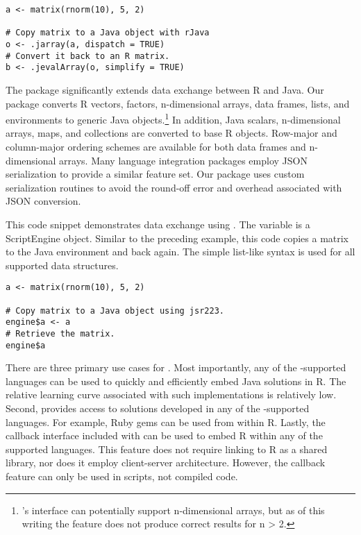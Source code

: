 \begin{verbatim}
a <- matrix(rnorm(10), 5, 2)

# Copy matrix to a Java object with rJava
o <- .jarray(a, dispatch = TRUE)
# Convert it back to an R matrix.
b <- .jevalArray(o, simplify = TRUE)
\end{verbatim}

The  package significantly extends data exchange between R and Java. Our package converts R vectors, factors, n-dimensional arrays, data frames, lists, and environments to generic Java objects.\footnote{'s interface can potentially support n-dimensional arrays, but as of this writing the feature does not produce correct results for n > 2.} In addition, Java scalars, n-dimensional arrays, maps, and collections are converted to base R objects. Row-major and column-major ordering schemes are available for both data frames and n-dimensional arrays. Many language integration packages employ JSON serialization to provide a similar feature set. Our package uses custom serialization routines to avoid the round-off error and overhead associated with JSON conversion.

This code snippet demonstrates data exchange using . The  variable is a  ScriptEngine object. Similar to the preceding  example, this code copies a matrix to the Java environment and back again. The simple list-like syntax is used for all supported data structures.

\begin{verbatim}
a <- matrix(rnorm(10), 5, 2)

# Copy matrix to a Java object using jsr223.
engine$a <- a
# Retrieve the matrix.
engine$a
\end{verbatim}

There are three primary use cases for . Most importantly, any of the -supported languages can be used to quickly and efficiently embed Java solutions in R. The relative learning curve associated with such implementations is relatively low. Second,  provides access to solutions developed in any of the -supported languages. For example, Ruby gems can be used from within R. Lastly, the callback interface included with  can be used to embed R within any of the supported languages. This feature does not require linking to R as a shared library, nor does it employ client-server architecture. However, the callback feature can only be used in scripts, not compiled code.

